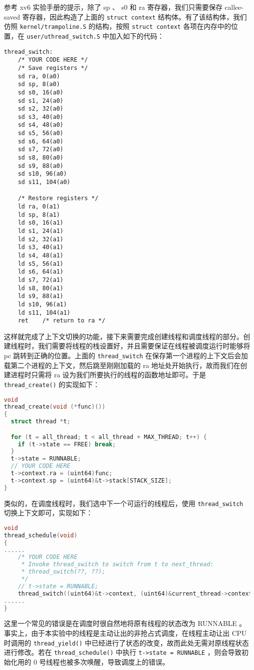 参考 xv6 实验手册的提示，除了 sp 、 s0 和 ra 寄存器，我们只需要保存 callee-saved 寄存器，因此构造了上面的 \lstinline{struct context} 结构体。有了该结构体，我们仿照 \lstinline{kernel/trampoline.S} 的结构，按照 \lstinline{struct context} 各项在内存中的位置，在 \lstinline{user/uthread_switch.S} 中加入如下的代码：
\begin{lstlisting}
thread_switch:
	/* YOUR CODE HERE */
	/* Save registers */
    sd ra, 0(a0)
    sd sp, 8(a0)
    sd s0, 16(a0)
    sd s1, 24(a0)
    sd s2, 32(a0)
    sd s3, 40(a0)
    sd s4, 48(a0)
    sd s5, 56(a0)
    sd s6, 64(a0)
    sd s7, 72(a0)
    sd s8, 80(a0)
    sd s9, 88(a0)
    sd s10, 96(a0)
    sd s11, 104(a0)

	/* Restore registers */
    ld ra, 0(a1)
    ld sp, 8(a1)
    ld s0, 16(a1)
    ld s1, 24(a1)
    ld s2, 32(a1)
    ld s3, 40(a1)
    ld s4, 48(a1)
    ld s5, 56(a1)
    ld s6, 64(a1)
    ld s7, 72(a1)
    ld s8, 80(a1)
    ld s9, 88(a1)
    ld s10, 96(a1)
    ld s11, 104(a1)
	ret    /* return to ra */
\end{lstlisting}

这样就完成了上下文切换的功能，接下来需要完成创建线程和调度线程的部分。创建线程时，我们需要将线程的栈设置好，并且需要保证在线程被调度运行时能够将 pc 跳转到正确的位置。上面的 \lstinline{thread_switch} 在保存第一个进程的上下文后会加载第二个进程的上下文，然后跳至刚刚加载的 ra 地址处开始执行，故而我们在创建进程时只需将 ra 设为我们所要执行的线程的函数地址即可。于是 \lstinline{thread_create()} 的实现如下：
\begin{lstlisting}[language=C]
void 
thread_create(void (*func)())
{
  struct thread *t;

  for (t = all_thread; t < all_thread + MAX_THREAD; t++) {
    if (t->state == FREE) break;
  }
  t->state = RUNNABLE;
  // YOUR CODE HERE
  t->context.ra = (uint64)func;
  t->context.sp = (uint64)&t->stack[STACK_SIZE];
}
\end{lstlisting}

类似的，在调度线程时，我们选中下一个可运行的线程后，使用 \lstinline{thread_switch} 切换上下文即可，实现如下：
\begin{lstlisting}[language=C]
void 
thread_schedule(void)
{
......
    /* YOUR CODE HERE
     * Invoke thread_switch to switch from t to next_thread:
     * thread_switch(??, ??);
     */
    // t->state = RUNNABLE;
    thread_switch((uint64)&t->context, (uint64)&current_thread->context);
......
}
\end{lstlisting}

\begin{theorem}
    这里一个常见的错误是在调度时很自然地将原有线程的状态改为 RUNNABLE 。事实上，由于本实验中的线程是主动让出的非抢占式调度，在线程主动让出 CPU 时调用的 \lstinline{thread_yield()} 中已经进行了状态的改变，故而此处无需对原线程状态进行修改。若在 \lstinline{thread_schedule()} 中执行 \lstinline{t->state = RUNNABLE} ，则会导致初始化用的 0 号线程也被多次唤醒，导致调度上的错误。
\end{theorem}


